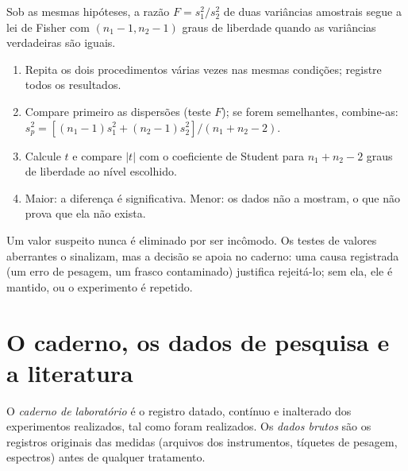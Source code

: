 \begin{proposition}[Teste $F$]\label{prop:b3:lab-techniques-3:f-test}
Sob as mesmas hipóteses, a razão $F = s_1^2/s_2^2$ de duas variâncias amostrais segue
a lei de Fisher com $(n_1 - 1, n_2 - 1)$ graus de liberdade quando as variâncias verdadeiras são iguais.
\admitted
\end{proposition}

\begin{method}\label{met:b3:lab-techniques-3:compare-means}
\begin{enumerate}
  \item Repita os dois procedimentos várias vezes nas mesmas condições; registre
        todos os resultados.
  \item Compare primeiro as dispersões (teste $F$); se forem semelhantes, combine-as:
        $s_p^2 = [(n_1 - 1)s_1^2 + (n_2 - 1)s_2^2]/(n_1 + n_2 - 2)$.
  \item Calcule $t$ e compare $|t|$ com o coeficiente de Student para $n_1 + n_2 - 2$ graus de
        liberdade ao nível escolhido.
  \item Maior: a diferença é significativa. Menor: os dados não a mostram,
        o que não prova que ela não exista.
\end{enumerate}
\end{method}

Um valor suspeito nunca é eliminado por ser incômodo. Os testes de valores aberrantes
o sinalizam, mas a decisão se apoia no caderno: uma causa registrada (um erro de
pesagem, um frasco contaminado) justifica rejeitá-lo; sem ela, ele é mantido,
ou o experimento é repetido.

\section{O caderno, os dados de pesquisa e a literatura}

\begin{definition}\label{def:b3:lab-techniques-3:notebook}
O \emph{caderno de laboratório} é o registro datado,
contínuo e inalterado dos experimentos realizados, tal como foram realizados. Os \emph{dados
brutos} são os registros originais das medidas (arquivos dos
instrumentos, tíquetes de pesagem, espectros) antes de qualquer tratamento.
\end{definition}


